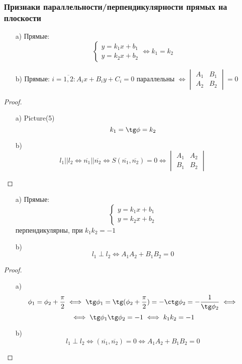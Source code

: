 \subsubsection{Признаки параллельности/перпендикулярности прямых на плоскости}
\begin{statement}
\begin{itemize}
  \item [a)]  Прямые:
    \begin{equation*}
      \begin{cases}
    y = k_1 x + b_1 \\
    y = k_2 x + b_2
      \end{cases} \iff k_1 = k_2
    \end{equation*} 
  \item [b) ] Прямые: $i = \overline{1,2} \colon A_i x + B_i y + C_i = 0 $ параллельны $\iff \begin{vmatrix}A_1 & B_1 \\ A_2 & B_2 \end{vmatrix} = 0$ 
\end{itemize}
\end{statement}
\begin{proof}
\begin{itemize}
  \item[a) ] Picture(5)\[
  k_1 = \tg \phi = k_2
  \]
\item [b) ] \[
    l_1 || l_2 \iff \overline{n_1} || \overline{n_2} \iff S(\overline{n_1}, \overline{n_2}) = 0 \iff \begin{vmatrix} A_1 & A_2 \\ B_1 & B_2 \end{vmatrix}
\]
\end{itemize}
\end{proof}
\begin{statement}
\begin{itemize}
  \item[a) ] Прямые:
    \begin{equation*}
    \begin{cases}
    y = k_1x + b_1 \\
    y = k_2x + b_2
    \end{cases}
    \end{equation*}
    перпендикулярны, при $k_1k_2 = -1$
  \item [b) ] \[
  l_1 \perp l_2 \iff A_1A_2 + B_1B_2 = 0
  \]
\end{itemize}
\end{statement}
\begin{proof}
\begin{itemize}
  \item [a) ] \[
  \phi_1 = \phi_2 + \frac{\pi}{2} \iff \tg\phi_1 = \tg(\phi_2 + \frac{\pi}{2}) = -\ctg\phi_2 = -\frac{1}{\tg\phi_2} \iff 
  \]
  \[
  \iff \tg\phi_1 \tg\phi_2 = -1 \iff k_1 k_2 = -1
  \]
\item [b) ] \[
    l_1 \perp l_2 \iff (\overline{n_1}, \overline{n_2}) = 0 \iff A_1A_2 + B_1B_2 = 0
\]
\end{itemize}
\end{proof}
